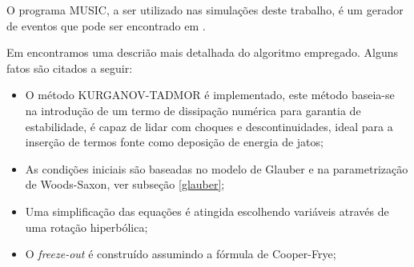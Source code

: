 O programa MUSIC, a ser utilizado nas simulações deste trabalho, é um
gerador de eventos que pode ser encontrado em \cite{noauthor_music_nodate}.
\par
Em \cite{schenke_3+1d_2010} encontramos uma descrião mais detalhada do algoritmo empregado. Alguns fatos
são citados a seguir:

\begin{itemize}
 \item O método KURGANOV-TADMOR é implementado, este método baseia-se na introdução de
 um termo de dissipação numérica para garantia de estabilidade, é capaz de lidar com
 choques e descontinuidades, ideal para a inserção de termos fonte como deposição de energia
 de jatos;
 \item As condições iniciais são baseadas no modelo de Glauber e na parametrização de Woods-Saxon,
 ver subseção \ref{glauber};
 \item Uma simplificação das equações é atingida escolhendo variáveis através de uma rotação hiperbólica;
 \item O {\it freeze-out} é construído assumindo a fórmula de Cooper-Frye\cite{teaney_chemical_2002};
\end{itemize}